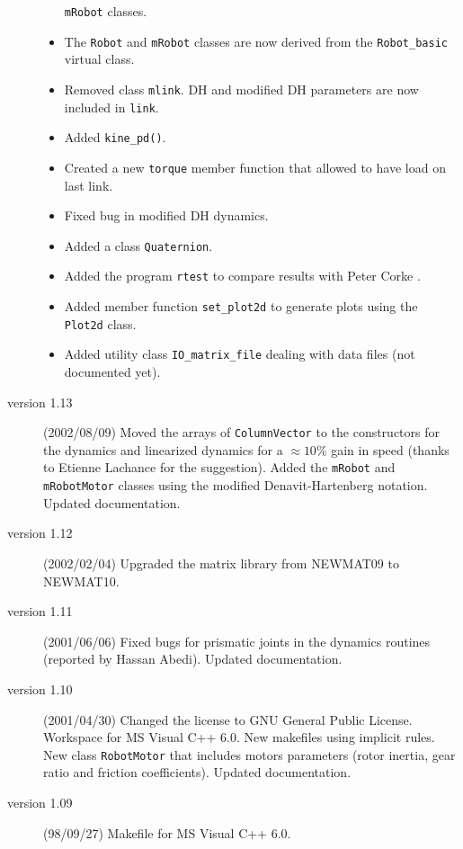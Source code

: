 \documentclass[11pt,fleqn,letterpaper]{report}
\begin{document}
\begin{description}
\begin{itemize}
    \texttt{mRobot} classes. 
  \item The \texttt{Robot} and \texttt{mRobot} classes are now derived
    from the \texttt{Robot\_basic} virtual class.
  \item Removed class \texttt{mlink}. DH and modified DH parameters
    are now included in \texttt{link}.
  \item Added \texttt{kine\_pd()}.
  \item Created a new \texttt{torque} member function that allowed to
    have load on last link.
  \item Fixed bug in modified DH dynamics.
  \item Added a class \texttt{Quaternion}.
  \item Added the program \texttt{rtest} to compare results with Peter
    Corke .
  \item Added member function \texttt{set\_plot2d} to generate plots
    using the \texttt{Plot2d} class.
  \item Added utility class \texttt{IO\_matrix\_file} dealing with
    data files (not documented yet).
  \end{itemize}

\item[version 1.13] (2002/08/09) Moved the arrays of
  \texttt{ColumnVector} to the constructors for the dynamics and
  linearized dynamics for a $\approx 10 \%$ gain in speed (thanks to
  Etienne Lachance for the suggestion). Added the \texttt{mRobot} and
  \texttt{mRobotMotor} classes using the modified Denavit-Hartenberg
  notation. Updated documentation.

\item[version 1.12] (2002/02/04) Upgraded the matrix library from
  \textsf{NEWMAT09} to \textsf{NEWMAT10}.

\item[version 1.11] (2001/06/06) Fixed bugs for prismatic joints in
  the dynamics routines (reported by Hassan Abedi).  Updated
  documentation.
  
\item[version 1.10] (2001/04/30) Changed the license to GNU General
  Public License. Workspace for MS \textsf{Visual C++} 6.0. New makefiles using
  implicit rules. New class \texttt{RobotMotor} that includes motors
  parameters (rotor inertia, gear ratio and friction coefficients).
  Updated documentation.

\item[version 1.09] (98/09/27) Makefile for \textsf{MS Visual C++} 6.0.  


\end{description}
\end{document}
